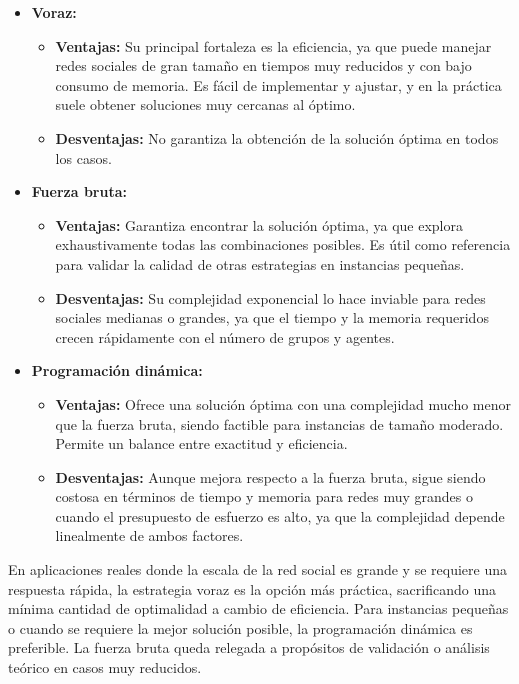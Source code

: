 \begin{itemize}
	\item \textbf{Voraz:}
	\begin{itemize}
		\item \textbf{Ventajas:} Su principal fortaleza es la eficiencia, ya que puede manejar redes sociales de gran tamaño en tiempos muy reducidos y con bajo consumo de memoria. Es fácil de implementar y ajustar, y en la práctica suele obtener soluciones muy cercanas al óptimo.

		\item \textbf{Desventajas:} No garantiza la obtención de la solución óptima en todos los casos.
	\end{itemize}

	\item \textbf{Fuerza bruta:}
	\begin{itemize}
		\item \textbf{Ventajas:} Garantiza encontrar la solución óptima, ya que explora exhaustivamente todas las combinaciones posibles. Es útil como referencia para validar la calidad de otras estrategias en instancias pequeñas.

		\item \textbf{Desventajas:} Su complejidad exponencial lo hace inviable para redes sociales medianas o grandes, ya que el tiempo y la memoria requeridos crecen rápidamente con el número de grupos y agentes.
	\end{itemize}

	\item \textbf{Programación dinámica:}
	\begin{itemize}
		\item \textbf{Ventajas:} Ofrece una solución óptima con una complejidad mucho menor que la fuerza bruta, siendo factible para instancias de tamaño moderado. Permite un balance entre exactitud y eficiencia.

		\item \textbf{Desventajas:} Aunque mejora respecto a la fuerza bruta, sigue siendo costosa en términos de tiempo y memoria para redes muy grandes o cuando el presupuesto de esfuerzo es alto, ya que la complejidad depende linealmente de ambos factores.
	\end{itemize}
\end{itemize}

En aplicaciones reales donde la escala de la red social es grande y se requiere una respuesta rápida, la estrategia voraz es la opción más práctica, sacrificando una mínima cantidad de optimalidad a cambio de eficiencia. Para instancias pequeñas o cuando se requiere la mejor solución posible, la programación dinámica es preferible. La fuerza bruta queda relegada a propósitos de validación o análisis teórico en casos muy reducidos.


